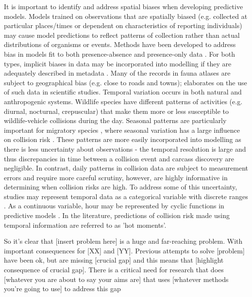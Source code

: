 It is important to identify and address spatial biases when developing predictive models. Models trained on observations that are spatially biased (e.g. collected at particular places/times or dependent on characteristics of reporting individuals) may cause model predictions to reflect patterns of collection rather than actual distributions of organisms or events. Methods have been developed to address bias in models fit to both presence-absence \citep{hijm12} and presence-only data \citep{kram13}. For both types, implicit biases in data may be incorporated into modelling if they are adequately described in metadata \citep{wart13}. Many of the records in fauna atlases are subject to geographical bias (e.g. close to roads and towns); \cite{grah04} elaborates on the use of such data in scientific studies.
Temporal variation occurs in both natural and anthropogenic systems. Wildlife species have different patterns of activities (e.g. diurnal, nocturnal, crepuscular) that make them more or less susceptible to wildlife-vehicle collisions during the day. Seasonal patterns are particularly important for migratory species \citep{hick85,bern92}, where seasonal variation has a large influence on collision risk \citep{shep08}. These patterns are more easily incorporated into modelling as there is less uncertainty about observations - the temporal resolution is large and thus discrepancies in time between a collision event and carcass discovery are negligible. In contrast, daily patterns in collision data are subject to measurement errors and require more careful scrutiny, however, are highly informative in determining when collision risks are high. To address some of this uncertainty, studies may represent temporal data as a categorical variable \citep{mizu14} with discrete ranges \citep{rowd08}. As a continuous variable, hour may be represented by cyclic functions in predictive models \citep{neum12,thur15}. In the literature, predictions of collision risk made using temporal information are referred to as 'hot moments'.

So it's clear that [insert problem here] is a huge and far-reaching problem. With important consequences for [XX] and [YY]. Previous attempts to solve [problem] have been ok, but are missing [crucial gap] and this means that [highlight consequence of crucial gap]. There is a critical need for research that does [whatever you are about to say your aims are] that uses [whatever methods you're going to use] to address this gap

